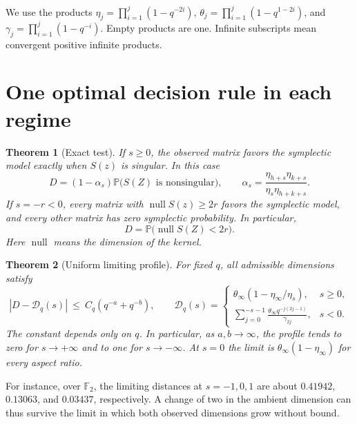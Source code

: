 \documentclass[11pt]{article}
\newtheorem{theorem}{Theorem}
\newcommand{\nil}{\operatorname{null}}
\newcommand{\Prob}{\mathbb P}
\begin{document}
We use the products $\eta_j=\prod_{i=1}^j(1-q^{-2i})$, $\theta_j=\prod_{i=1}^j(1-q^{1-2i})$, and $\gamma_j=\prod_{i=1}^j(1-q^{-i})$. Empty products are one. Infinite subscripts mean convergent positive infinite products.

\section{One optimal decision rule in each regime}

\begin{theorem}[Exact test]\label{th:finite}
If $s\ge0$, the observed matrix favors the symplectic model exactly when $S(z)$ is singular. In this case
\begin{equation}
 D=(1-\alpha_s)\Prob\bigl(S(Z)\text{ is nonsingular}\bigr),
 \qquad \alpha_s=\frac{\eta_{h+s}\eta_{k+s}}{\eta_s\eta_{h+k+s}}.
 \label{eq:positive}
\end{equation}
If $s=-r<0$, every matrix with $\nil S(z)\ge 2r$ favors the symplectic model, and every other matrix has zero symplectic probability. In particular,
\begin{equation}
 D=\Prob\bigl(\nil S(Z)<2r\bigr).
 \label{eq:negative}
\end{equation}
Here $\nil$ means the dimension of the kernel.
\end{theorem}

\begin{theorem}[Uniform limiting profile]\label{th:limit}
For fixed $q$, all admissible dimensions satisfy
\begin{equation}
 |D-\mathcal D_q(s)|\ \le\ C_q(q^{-a}+q^{-b}),\qquad
 \mathcal D_q(s)=
 \begin{cases}
 \theta_\infty(1-\eta_\infty/\eta_s),&s\ge0,\\[2pt]
 \displaystyle\sum_{j=0}^{-s-1}
 \frac{\theta_\infty q^{-j(2j-1)}}{\gamma_{2j}},&s<0 .
 \end{cases}
 \label{eq:profile}
\end{equation}
The constant depends only on $q$. In particular, as $a,b\to\infty$, the profile tends to zero for $s\to+\infty$ and to one for $s\to-\infty$. At $s=0$ the limit is $\theta_\infty(1-\eta_\infty)$ for every aspect ratio.
\end{theorem}

For instance, over $\mathbb F_2$, the limiting distances at $s=-1,0,1$ are about $0.41942$, $0.13063$, and $0.03437$, respectively. A change of two in the ambient dimension can thus survive the limit in which both observed dimensions grow without bound.
\end{document}
